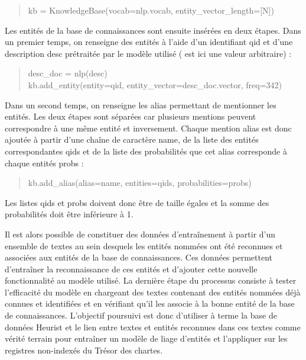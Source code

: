 \documentclass[a4paper,12pt,twoside]{book}
\begin{document}
	\begin{quotation}
		kb = KnowledgeBase(vocab=nlp.vocab, entity\_vector\_length=[N])
	\end{quotation}
	
	Les entités de la base de connaissances sont ensuite insérées en deux étapes. Dans un premier temps, on renseigne des entités à l'aide d'un identifiant \og qid\fg{} et d'une description \og desc\fg{} prétraitée par le modèle utilisé (\fg{} est ici une valeur arbitraire) :
	
	\begin{quotation}
			desc\_doc = nlp(desc)\\
			\indent kb.add\_entity(entity=qid, entity\_vector=desc\_doc.vector, freq=342)
	\end{quotation}
	
	Dans un second temps, on renseigne les alias permettant de mentionner les entités. Les deux étapes sont séparées car plusieurs mentions peuvent correspondre à une même entité et inversement. Chaque mention \og alias\fg{} est donc ajoutée à partir d'une chaîne de caractère \og name\fg{}, de la liste des entités correspondantes \og qids\fg{} et de la liste des probabilités que cet alias corresponde à chaque entités \og probs\fg{} :
	
	\begin{quotation}
		kb.add\_alias(alias=name, entities=qids, probabilities=probs)
	\end{quotation}
	
	\noindent Les listes \og qids\fg{} et \og probs\fg{} doivent donc être de taille égales et la somme des probabilités doit être inférieure à 1.
	
	Il est alors possible de constituer des données d'entraînement à partir d'un ensemble de textes au sein desquels les entités nommées ont été reconnues et associées aux entités de la base de connaissances. Ces données permettent d'entraîner la reconnaissance de ces entités et d'ajouter cette nouvelle fonctionnalité au modèle utilisé. La dernière étape du processus consiste à tester l'efficacité du modèle en chargeant des textes contenant des entités nommées déjà connues et identifiées et en vérifiant qu'il les associe à la bonne entité de la base de connaissances. L'objectif poursuivi est donc d'utiliser à terme la base de données Heurist et le lien entre textes et entités reconnues dans ces textes comme vérité terrain pour entraîner un modèle de liage d'entités et l'appliquer sur les registres non-indexés du Trésor des chartes.
	
\end{document}
